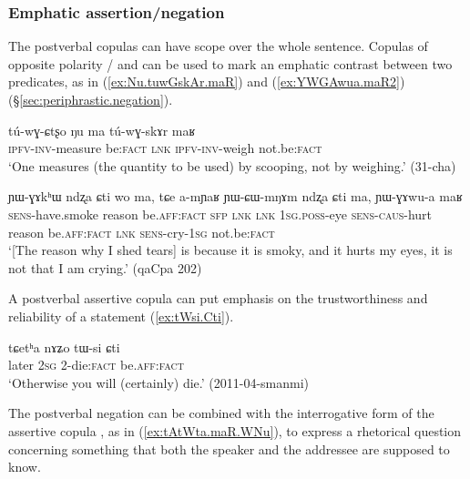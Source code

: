  
\subsubsection{Emphatic assertion/negation} \label{sec:affirmative.copula.function}
The postverbal copulas can have scope over the whole sentence. Copulas of opposite polarity / and  can be used to mark an emphatic contrast between two predicates, as in (\ref{ex:Nu.tuwGskAr.maR}) and (\ref{ex:YWGAwua.maR2}) (§\ref{sec:periphrastic.negation}).

\begin{exe}
\ex \label{ex:Nu.tuwGskAr.maR}
\gll  tú-wɣ-ɕtʂo ŋu ma tú-wɣ-skɤr maʁ \\
\textsc{ipfv}-\textsc{inv}-measure be:\textsc{fact} \textsc{lnk} \textsc{ipfv}-\textsc{inv}-weigh not.be:\textsc{fact} \\
\glt `One measures (the quantity to be used) by scooping, not by weighing.' (31-cha)
\end{exe}

\begin{exe}
\ex \label{ex:YWGAwua.maR2}
\gll ɲɯ-ɣɤkʰɯ ndʐa ɕti wo ma, tɕe a-mɲaʁ ɲɯ-ɕɯ-mŋɤm ndʐa ɕti ma, ɲɯ-ɣɤwu-a maʁ \\
\textsc{sens}-have.smoke reason be.\textsc{aff}:\textsc{fact} \textsc{sfp} \textsc{lnk} \textsc{lnk} \textsc{1sg}.\textsc{poss}-eye \textsc{sens}-\textsc{caus}-hurt reason be.\textsc{aff}:\textsc{fact} \textsc{lnk} \textsc{sens}-cry-\textsc{1sg} not.be:\textsc{fact} \\
\glt `[The reason why I shed tears] is because it is smoky, and it hurts my eyes, it is not that I am crying.' (qaCpa 202)
\end{exe}

A postverbal assertive copula can put emphasis on the trustworthiness and reliability of a statement  (\ref{ex:tWsi.Cti}).

\begin{exe}
\ex \label{ex:tWsi.Cti}
\gll  tɕetʰa nɤʑo tɯ-si ɕti \\
later \textsc{2sg} 2-die:\textsc{fact} be.\textsc{aff}:\textsc{fact} \\
\glt `Otherwise you will (certainly) die.' (2011-04-smanmi)
\end{exe}

The postverbal negation  can be combined with the interrogative form of the assertive copula , as in (\ref{ex:tAtWta.maR.WNu}), to express a rhetorical question concerning something that both the speaker and the addressee are supposed to know.

